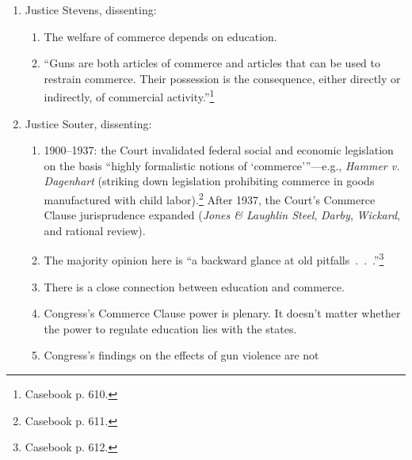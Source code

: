 \begin{enumerate}
    \begin{enumerate}
        \item ``~.~.~.~the term `commerce' denoted sale and/or transport 
        rather than business generally.''\footnote{Casebook p. 608.}
        \item A more expansive reading of the meaning of ``commerce'' would 
        render many other constitutional clauses superfluous.
        \item ``Taken together, these fundamental textual problems should, at 
        the very least, convince us that the `substantial effects' test should 
        be reexamined~.~.~.''\footnote{Casebook p. 609.}
    \end{enumerate}
    \item Justice Stevens, dissenting:
    \begin{enumerate}
        \item The welfare of commerce depends on education.
        \item ``Guns are both articles of commerce and articles that can be 
        used to restrain commerce. Their possession is the consequence, either 
        directly or indirectly, of commercial activity.''\footnote{Casebook p. 
        610.}
    \end{enumerate}
    \item Justice Souter, dissenting:
    \begin{enumerate}
        \item 1900--1937: the Court invalidated federal social and economic 
        legislation on the basis \enquote{highly formalistic notions of 
        \enquote{commerce}}---e.g., \emph{Hammer v. Dagenhart} (striking down 
        legislation prohibiting commerce in goods manufactured with child 
        labor).\footnote{Casebook p. 611.} After 1937, the Court's Commerce 
        Clause jurisprudence expanded (\emph{Jones \& Laughlin Steel}, 
        \emph{Darby}, \emph{Wickard}, and rational review).
        \item The majority opinion here is ``a backward glance at old 
        pitfalls~.~.~.''\footnote{Casebook p. 612.}
        \item There is a close connection between education and commerce.
        \item Congress's Commerce Clause power is plenary. It doesn't matter 
        whether the power to regulate education lies with the states.
        \item Congress's findings on the effects of gun violence are not 

\end{enumerate}
\end{enumerate}
